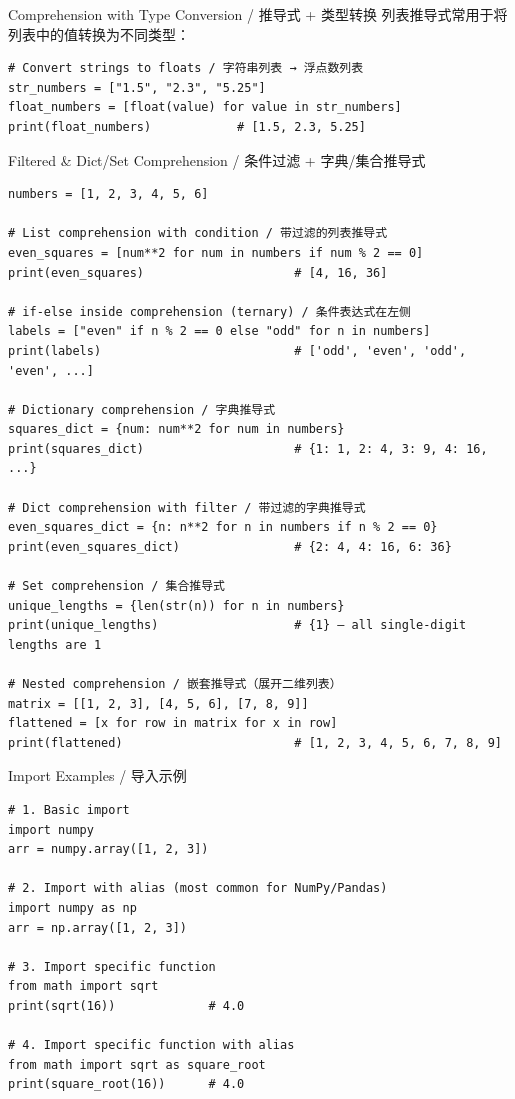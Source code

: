 \documentclass[11pt,a4paper]{report}
\begin{document}
\begin{examplebox}{Comprehension with Type Conversion / 推导式 + 类型转换}
    列表推导式常用于将列表中的值转换为不同类型：
\begin{lstlisting}
# Convert strings to floats / 字符串列表 → 浮点数列表
str_numbers = ["1.5", "2.3", "5.25"]
float_numbers = [float(value) for value in str_numbers]
print(float_numbers)            # [1.5, 2.3, 5.25]
\end{lstlisting}
\end{examplebox}

\begin{examplebox}{Filtered \& Dict/Set Comprehension / 条件过滤 + 字典/集合推导式}
\begin{lstlisting}
numbers = [1, 2, 3, 4, 5, 6]

# List comprehension with condition / 带过滤的列表推导式
even_squares = [num**2 for num in numbers if num % 2 == 0]
print(even_squares)                     # [4, 16, 36]

# if-else inside comprehension (ternary) / 条件表达式在左侧
labels = ["even" if n % 2 == 0 else "odd" for n in numbers]
print(labels)                           # ['odd', 'even', 'odd', 'even', ...]

# Dictionary comprehension / 字典推导式
squares_dict = {num: num**2 for num in numbers}
print(squares_dict)                     # {1: 1, 2: 4, 3: 9, 4: 16, ...}

# Dict comprehension with filter / 带过滤的字典推导式
even_squares_dict = {n: n**2 for n in numbers if n % 2 == 0}
print(even_squares_dict)                # {2: 4, 4: 16, 6: 36}

# Set comprehension / 集合推导式
unique_lengths = {len(str(n)) for n in numbers}
print(unique_lengths)                   # {1} — all single-digit lengths are 1

# Nested comprehension / 嵌套推导式（展开二维列表）
matrix = [[1, 2, 3], [4, 5, 6], [7, 8, 9]]
flattened = [x for row in matrix for x in row]
print(flattened)                        # [1, 2, 3, 4, 5, 6, 7, 8, 9]
\end{lstlisting}
\end{examplebox}

\begin{examplebox}{Import Examples / 导入示例}
\begin{lstlisting}
# 1. Basic import
import numpy
arr = numpy.array([1, 2, 3])

# 2. Import with alias (most common for NumPy/Pandas)
import numpy as np
arr = np.array([1, 2, 3])

# 3. Import specific function
from math import sqrt
print(sqrt(16))             # 4.0

# 4. Import specific function with alias
from math import sqrt as square_root
print(square_root(16))      # 4.0
\end{lstlisting}
\end{examplebox}
\end{document}
